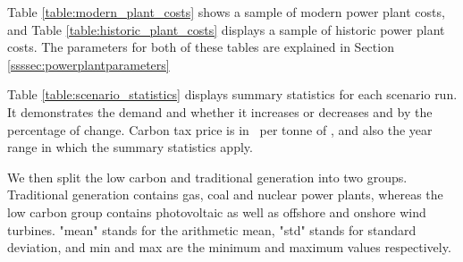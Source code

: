 

Table \ref{table:modern_plant_costs} shows a sample of modern power plant costs, and Table \ref{table:historic_plant_costs} displays a sample of historic power plant costs. The parameters for both of these tables are explained in Section \ref{ssssec:powerplantparameters}

Table \ref{table:scenario_statistics} displays summary statistics for each scenario run. It demonstrates the demand and whether it increases or decreases and by the percentage of change. Carbon tax price is in \textsterling\ per tonne of , and also the year range in which the summary statistics apply. 

We then split the low carbon and traditional generation into two groups. Traditional generation contains gas, coal and nuclear power plants, whereas the low carbon group contains photovoltaic as well as offshore and onshore wind turbines. "mean" stands for the arithmetic mean, "std" stands for standard deviation, and min and max are the minimum and maximum values respectively.



